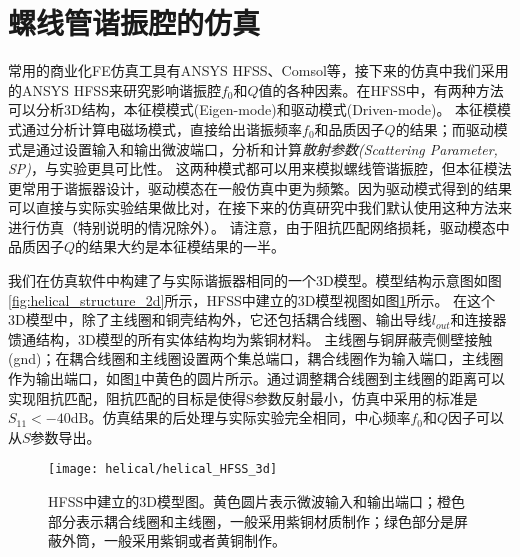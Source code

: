 \section[螺线管谐振腔的仿真]{螺线管谐振腔的仿真}

常用的商业化FE仿真工具有ANSYS HFSS、Comsol等，接下来的仿真中我们采用的ANSYS HFSS来研究影响谐振腔$f_0$和$Q$值的各种因素。在HFSS中，有两种方法可以分析3D结构，本征模模式(Eigen-mode)和驱动模式(Driven-mode)。
本征模模式通过分析计算电磁场模式，直接给出谐振频率$f_0$和品质因子$Q$的结果；而驱动模式是通过设置输入和输出微波端口，分析和计算\emph{散射参数(Scattering Parameter, SP)}，与实验更具可比性。
这两种模式都可以用来模拟螺线管谐振腔，但本征模法更常用于谐振器设计，驱动模态在一般仿真中更为频繁。因为驱动模式得到的结果可以直接与实际实验结果做比对，在接下来的仿真研究中我们默认使用这种方法来进行仿真（特别说明的情况除外）。
请注意，由于阻抗匹配网络损耗\cite[]{Gandolfi_Niedermayr_Kumph_Brownnutt_Blatt_2012}，驱动模态中品质因子$Q$的结果大约是本征模结果的一半。

我们在仿真软件中构建了与实际谐振器相同的一个3D模型。模型结构示意图如图\ref{fig:helical_structure_2d}所示，HFSS中建立的3D模型视图如图\ref{fig:helical_HFSS_3d}所示。
在这个3D模型中，除了主线圈和铜壳结构外，它还包括耦合线圈、输出导线$l_{out}$和连接器馈通结构，3D模型的所有实体结构均为紫铜材料。
主线圈与铜屏蔽壳侧壁接触(gnd)；在耦合线圈和主线圈设置两个集总端口，耦合线圈作为输入端口，主线圈作为输出端口，如图\ref{fig:helical_HFSS_3d}中黄色的圆片所示。通过调整耦合线圈到主线圈的距离可以实现阻抗匹配，阻抗匹配的目标是使得S参数反射最小，仿真中采用的标准是$S_{11}<-40$dB。仿真结果的后处理与实际实验完全相同，中心频率$f_0$和$Q$因子可以从$S$参数导出。

\begin{figure}
    \centering
    \caption[HFSS中建立的3D模型图]{HFSS中建立的3D模型图。黄色圆片表示微波输入和输出端口；橙色部分表示耦合线圈和主线圈，一般采用紫铜材质制作；绿色部分是屏蔽外筒，一般采用紫铜或者黄铜制作。\label{fig:helical_HFSS_3d}}
    \texttt{[image: helical/helical\_HFSS\_3d]}
\end{figure}

